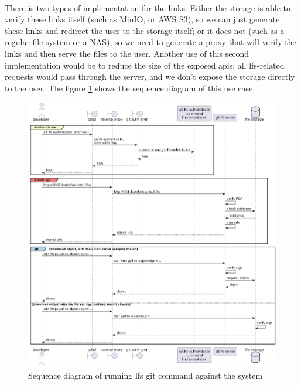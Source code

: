 \paragraph{}
There is two types of implementation for the links. Either the storage is able to verify these links itself (such as MinIO, or AWS S3), so we can just generate these links and redirect the user to the storage itself; or it does not (such as a regular file system or a NAS), so we need to generate a proxy that will verify the links and then serve the files to the user. Another use of this second implementation would be to reduce the size of the exposed apis: all lfs-related requests would pass through the server, and we don't expose the storage directly to the user. The figure \ref{fig:sequence_lfs} shows the sequence diagram of this use case.


\begin{figure}[ht]
    \centering
    \includegraphics[width=1\textwidth]{iteration_02/diagrams/sequence_lfs.png}
    \caption{Sequence diagram of running lfs git command against the system}
    \label{fig:sequence_lfs}
\end{figure}
